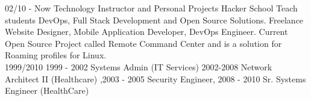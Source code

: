 \documentclass[]{friggeri-cv}
\begin{document}
\begin{entrylist}
    \entry
    {02/10 - Now}
    {Technology Instructor and Personal Projects}
    {Hacker School}
    {Teach students DevOps, Full Stack Development and Open Source Solutions. Freelance Website Designer, Mobile Application Developer, DevOps Engineer. Current Open Source Project called Remote Command Center and is a solution for Roaming profiles for Linux. \\}
      \entry
    {1999/2010}
    { 1999 - 2002 Systems Admin (IT Services) 2002-2008 Network Architect II (Healthcare) ,2003 - 2005 Security Engineer, 2008 - 2010 Sr. Systems Engineer (HealthCare) }
    {}
    { \\}
\end{entrylist}




\begin{flushleft}
\emph{}
\end{flushleft}
\begin{flushright}
\emph{}
\end{flushright}

% 
\end{document}
